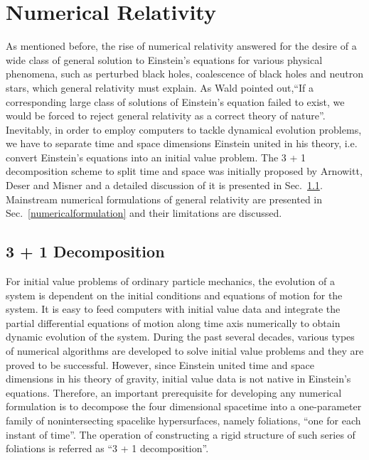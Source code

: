\chapter{Numerical Relativity}\label{nr}
As mentioned before, the rise of numerical relativity answered for the desire of a wide class of general solution to Einstein's equations for various physical phenomena, such as perturbed black holes, coalescence of black holes and neutron stars, which general relativity must explain. As Wald pointed out,``If a corresponding large class of solutions of Einstein's equation failed to exist, we would be forced to reject general relativity as a correct theory of nature''\cite{Wald}. Inevitably, in order to employ computers to tackle dynamical evolution problems, we have to separate time and space dimensions Einstein united in his theory, i.e. convert Einstein's equations into an initial value problem. The 3 + 1 decomposition scheme to split time and space was initially proposed by Arnowitt, Deser and Misner\cite{ADM:Witten} and a detailed discussion of it is presented in Sec.~\ref{3+1}. Mainstream numerical formulations of general relativity are presented in Sec.~\ref{numericalformulation} and their limitations are discussed. 
\section{3 + 1 Decomposition}\label{3+1}
For initial value problems of ordinary particle mechanics, the evolution of a system is dependent on the initial conditions and equations of motion for the system. It is easy to feed computers with initial value data and integrate the partial differential equations of motion along time axis numerically to obtain dynamic evolution of the system. During the past several decades, various types of numerical algorithms are developed to solve initial value problems and they are proved to be successful. However, since Einstein united time and space dimensions in his theory of gravity, initial value data is not native in Einstein's equations. Therefore, an important prerequisite for developing any numerical formulation is to decompose the four dimensional spacetime into a one-parameter family of nonintersecting spacelike hypersurfaces, namely foliations, ``one for each instant of time''. The operation of constructing a rigid structure of such series of foliations is referred as ``3 + 1 decomposition''. 


